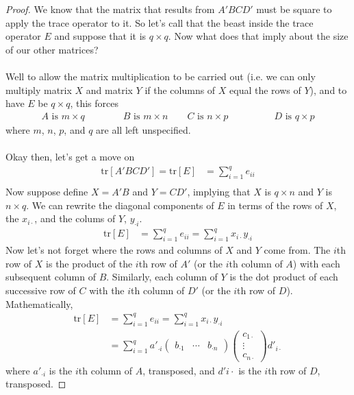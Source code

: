 \documentclass[a4paper,12pt]{scrartcl}
\begin{document}
\begin{proof} We know that the matrix that results from 
$A'BCD'$ must be square to
apply the trace operator to it.  So let's call that the beast 
inside the trace operator $E$ and suppose that it is
$q \times q$. Now what does that imply about the size of our
other matrices? 
\\
\\
Well to allow the matrix multiplication to 
be carried out (i.e. we can only multiply matrix $X$ and
matrix $Y$ if the columns of $X$ equal the rows of $Y$), 
and to have $E$ be $q\times q$, this forces
\begin{align*}
    A \text{ is } m \times q \qquad 
	 \qquad B \text{ is } m \times n \qquad
    C \text{ is } n \times p \qquad 
	& \qquad
    D \text{ is } q \times p
\end{align*}
where $m$, $n$, $p$, and $q$ are all left unspecified.
\\
\\
Okay then, let's get a move on
\begin{align*}
    \text{tr}[A'BCD'] = \text{tr}[E] &= 
	\sum^q_{i=1} e_{ii} \\
\end{align*}
Now suppose define $X = A'B$ and $Y = CD'$, implying
that $X$ is $q\times n$ and $Y$ is $n\times q$.
We can rewrite the diagonal components of $E$ in 
terms of the rows of $X$, the $x_{i\cdot}$, and 
the colums of $Y$, $y_{\cdot i}$.
\begin{align*}
    \text{tr}[E] &= 
	\sum^q_{i=1} e_{ii} 
	= \sum^q_{i=1} x_{i\cdot} y_{\cdot i}
\end{align*}
Now let's not forget where the rows and columns of 
$X$ and $Y$ come from. The $i$th row of $X$ is 
the product of the $i$th row of $A'$ (or the $i$th
column of $A$) with 
each subsequent column of $B$. Similarly, each
column of $Y$ is the dot product of each 
successive row of $C$ with the $i$th column of $D'$
(or the $i$th row of $D$).
Mathematically, 
\begin{align*}
    \text{tr}[E] &= 
	\sum^q_{i=1} e_{ii} 
	= \sum^q_{i=1} x_{i\cdot} y_{\cdot i} \\
    &= \sum^q_{i=1} a'_{\cdot i} 
	\begin{pmatrix} b_{\cdot 1} & \cdots & b_{\cdot n}
	\end{pmatrix}
	\begin{pmatrix} c_{1\cdot} \\ \vdots \\ c_{n \cdot}
	\end{pmatrix} 
	d'_{i \cdot}
\end{align*}
where $a'_{\cdot i}$ is the $i$th column of $A$,
transposed, and $d'{i \cdot}$ is the $i$th row of $D$,
transposed.


\end{proof}
\end{document}
